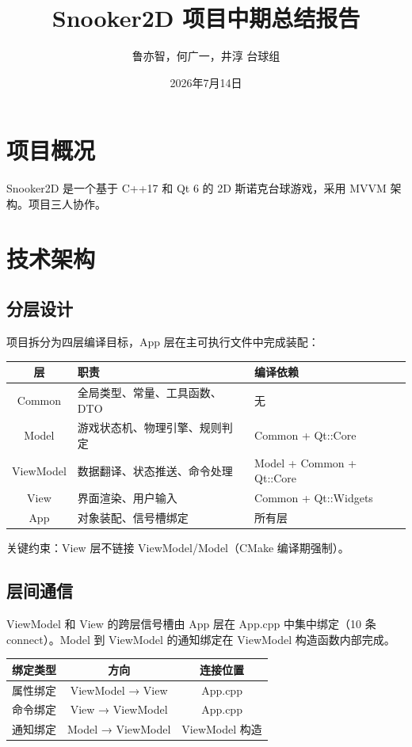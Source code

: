 \documentclass[11pt]{ctexart}
\title{Snooker2D 项目中期总结报告}
\author{鲁亦智，何广一，井淳 \quad 台球组}
\date{2026年7月14日}
\begin{document}
\maketitle

\section{项目概况}

Snooker2D 是一个基于 C++17 和 Qt 6 的 2D 斯诺克台球游戏，采用 MVVM 架构。项目三人协作。

\section{技术架构}

\subsection{分层设计}

项目拆分为四层编译目标，App 层在主可执行文件中完成装配：

\begin{center}
\begin{tabular}{|c|l|l|}
\hline
\textbf{层} & \textbf{职责} & \textbf{编译依赖} \\
\hline
Common & 全局类型、常量、工具函数、DTO & 无 \\
Model & 游戏状态机、物理引擎、规则判定 & Common + Qt::Core \\
ViewModel & 数据翻译、状态推送、命令处理 & Model + Common + Qt::Core \\
View & 界面渲染、用户输入 & Common + Qt::Widgets \\
App & 对象装配、信号槽绑定 & 所有层 \\
\hline
\end{tabular}
\end{center}

关键约束：View 层不链接 ViewModel/Model（CMake 编译期强制）。

\subsection{层间通信}

ViewModel 和 View 的跨层信号槽由 App 层在 App.cpp 中集中绑定（10 条 connect）。Model 到 ViewModel 的通知绑定在 ViewModel 构造函数内部完成。

\begin{center}
\begin{tabular}{|c|c|c|}
\hline
\textbf{绑定类型} & \textbf{方向} & \textbf{连接位置} \\
\hline
属性绑定 & ViewModel → View & App.cpp \\
命令绑定 & View → ViewModel & App.cpp \\
通知绑定 & Model → ViewModel & ViewModel 构造 \\
\hline
\end{tabular}
\end{center}
\end{document}
